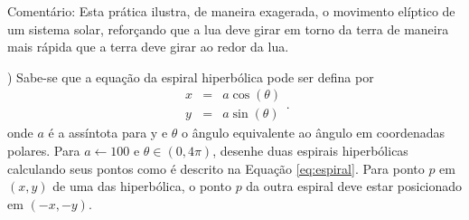 \begin{renumerate}
  Comentário: Esta prática ilustra, de maneira exagerada, o movimento elíptico de um sistema solar, reforçando que a lua deve girar em torno da terra de maneira mais rápida que a terra deve girar ao redor da lua.
%

\item)
Sabe-se que a equação da espiral hiperbólica pode ser defina por
\begin{equation} \label{eq:espiral}
  \begin{matrix}
  x & = & a \cos(\theta) \\ 
  y & = & a \sin(\theta)
  \end{matrix}.
\end{equation}
  onde $a$ é a assíntota para y e $\theta$ o ângulo equivalente ao ângulo em coordenadas polares. Para $a \gets 100$ e $\theta \in (0, 4\pi)$, desenhe duas espirais hiperbólicas calculando seus pontos como é descrito na Equação \ref{eq:espiral}. Para ponto $p$ em $(x,y)$ de uma das hiperbólica, o ponto $p$ da outra espiral deve estar posicionado em $(-x,-y)$.

  \label{ex:cap01_ex5}


\end{renumerate}
